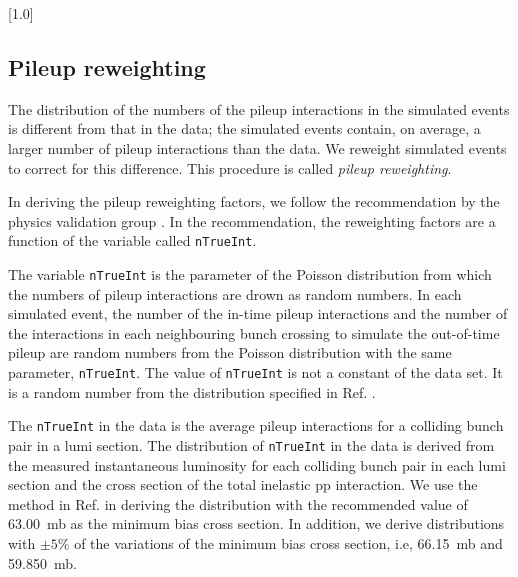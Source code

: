\begin{table}[!h]
 \centering
 \tiny
 \scalebox{.7}[1.0]{}
 \label{tab:datasets_bkg}
\end{table}


\clearpage

\subsection{Pileup reweighting}
\label{sec:pileup-reweighting}

The distribution of the numbers of the pileup interactions in the
simulated events is different from that in the data; the simulated
events contain, on average, a larger number of pileup interactions than
the data. We reweight simulated events to correct for this difference.
This procedure is called \textit{pileup reweighting}.

In deriving the pileup reweighting factors, we follow the
recommendation by the physics validation group
\cite{twiki-PdmVPileUpDescription, twiki-PileupJSONFileforData}. In
the recommendation, the reweighting factors are a function of the
variable called \verb!nTrueInt!.

The variable \verb!nTrueInt! is the parameter of the Poisson
distribution from which the numbers of pileup interactions are drown
as random numbers. In each simulated event, the number of the in-time
pileup interactions and the number of the interactions in each
neighbouring bunch crossing to simulate the out-of-time pileup are
random numbers from the Poisson distribution with the same parameter,
\verb!nTrueInt!. The value of \verb!nTrueInt! is not a constant of the
data set. It is a random number from the distribution specified in
Ref. \cite{github-mix_2016_25ns_SpringMC_PUScenarioV1_PoissonOOTPU_cfi}.

The \verb!nTrueInt! in the data is the average pileup interactions for
a colliding bunch pair in a lumi section. The distribution of
\verb!nTrueInt! in the data is derived from the measured instantaneous
luminosity for each colliding bunch pair in each lumi section and the
cross section of the total inelastic pp interaction. We use the method
in Ref. \cite{twiki-PileupJSONFileforData} in deriving the
distribution with the recommended value of 63.00~mb as the minimum
bias cross section. In addition, we derive distributions with $\pm
5\%$ of the variations of the minimum bias cross section, i.e,
66.15~mb and 59.850~mb.

